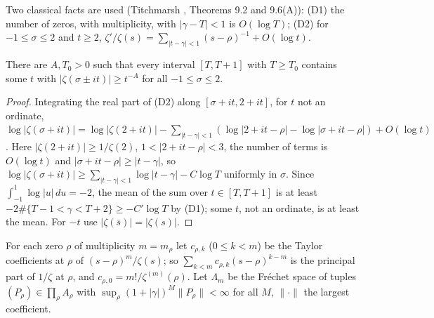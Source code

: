 Two classical facts are used (Titchmarsh \cite{Titchmarsh}, Theorems 9.2 and 9.6(A)):
(D1) the number of zeros, with multiplicity, with $|\gamma-T|<1$ is $O(\log T)$;
(D2) for $-1\le\sigma\le2$ and $t\ge2$, $\zeta'/\zeta(s)=\sum_{|t-\gamma|<1}(s-\rho)^{-1}+O(\log t)$.

\begin{lemma}\label{lem:goodheights}
There are $A,T_0>0$ such that every interval $[T,T+1]$ with $T\ge T_0$ contains some $t$ with $|\zeta(\sigma\pm it)|\ge t^{-A}$ for all $-1\le\sigma\le2$.
\end{lemma}

\begin{proof}
Integrating the real part of (D2) along $[\sigma+it,2+it]$, for $t$ not an ordinate,
$\log|\zeta(\sigma+it)|=\log|\zeta(2+it)|-\sum_{|t-\gamma|<1}(\log|2+it-\rho|-\log|\sigma+it-\rho|)+O(\log t)$.
Here $|\zeta(2+it)|\ge1/\zeta(2)$, $1<|2+it-\rho|<3$, the number of terms is $O(\log t)$ and $|\sigma+it-\rho|\ge|t-\gamma|$, so $\log|\zeta(\sigma+it)|\ge\sum_{|t-\gamma|<1}\log|t-\gamma|-C\log T$ uniformly in $\sigma$.
Since $\int_{-1}^1\log|u|\,du=-2$, the mean of the sum over $t\in[T,T+1]$ is at least $-2\#\{T-1<\gamma<T+2\}\ge-C'\log T$ by (D1); some $t$, not an ordinate, is at least the mean. For $-t$ use $|\zeta(\bar s)|=|\zeta(s)|$.
\end{proof}

For each zero $\rho$ of multiplicity $m=m_\rho$ let $c_{\rho,k}$ ($0\le k<m$) be the Taylor coefficients at $\rho$ of $(s-\rho)^m/\zeta(s)$; so $\sum_{k<m}c_{\rho,k}(s-\rho)^{k-m}$ is the principal part of $1/\zeta$ at $\rho$, and $c_{\rho,0}=m!/\zeta^{(m)}(\rho)$.
Let $\Lambda_m$ be the Fréchet space of tuples $(P_\rho)\in\prod_\rho A_\rho$ with $\sup_\rho(1+|\gamma|)^M\|P_\rho\|<\infty$ for all $M$, $\|\cdot\|$ the largest coefficient.

